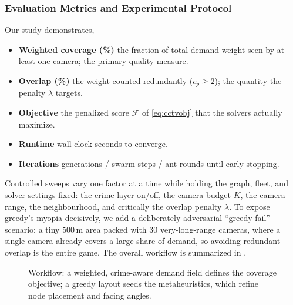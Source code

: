 \documentclass{ai-lab-report}
\begin{document}
\subsubsection{Evaluation Metrics and Experimental Protocol}
Our study demonstrates,
\begin{itemize}[leftmargin=1.4em,itemsep=2pt,topsep=2pt]
  \item \textbf{Weighted coverage (\%)}   the fraction of total demand weight seen by at least one camera; the primary quality measure.
  \item \textbf{Overlap (\%)}   the weight counted redundantly ($c_p\ge2$); the quantity the penalty $\lambda$ targets.
  \item \textbf{Objective}   the penalized score $\mathcal F$ of \cref{eq:cctvobj} that the solvers actually maximize.
  \item \textbf{Runtime}   wall-clock seconds to converge.
  \item \textbf{Iterations}   generations / swarm steps / ant rounds until early stopping.
\end{itemize}

Controlled sweeps vary one factor at a time while holding the graph, fleet, and solver settings fixed: the crime layer on/off, the camera budget $K$, the camera range, the neighbourhood, and critically the overlap penalty $\lambda$. To expose greedy's myopia decisively, we add a deliberately adversarial ``greedy-fail'' scenario: a tiny $500$\,m area packed with $30$ very-long-range cameras, where a single camera already covers a large share of demand, so avoiding redundant overlap is the entire game. The overall workflow is summarized in .

\begin{figure}[H]
  \centering
  \caption{Workflow: a weighted, crime-aware demand field defines the coverage objective; a greedy layout seeds the metaheuristics, which refine node placement and facing angles.}
  \label{fig:a3workflow}
\end{figure}
\end{document}
